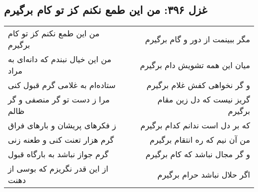 \begin{center}
\section*{غزل ۳۹۶: من این طمع نکنم کز تو کام برگیرم}
\label{sec:396}
\begin{longtable}{l p{0.5cm} r}
من این طمع نکنم کز تو کام برگیرم
&&
مگر ببینمت از دور و گام برگیرم
\\
من این خیال نبندم که دانه‌ای به مراد
&&
میان این همه تشویش دام برگیرم
\\
ستاده‌ام به غلامی گرم قبول کنی
&&
و گر نخواهی کفش غلام برگیرم
\\
مرا ز دست تو گر منصفی و گر ظالم
&&
گریز نیست که دل زین مقام برگیرم
\\
ز فکرهای پریشان و بارهای فراق
&&
که بر دل است ندانم کدام برگیرم
\\
گرم هزار تعنت کنی و طعنه زنی
&&
من آن نیم که ره انتقام برگیرم
\\
گرم جواز نباشد به بارگاه قبول
&&
و گر مجال نباشد که کام برگیرم
\\
از این قدر نگریزم که بوسی از دهنت
&&
اگر حلال نباشد حرام برگیرم
\\
\end{longtable}
\end{center}
